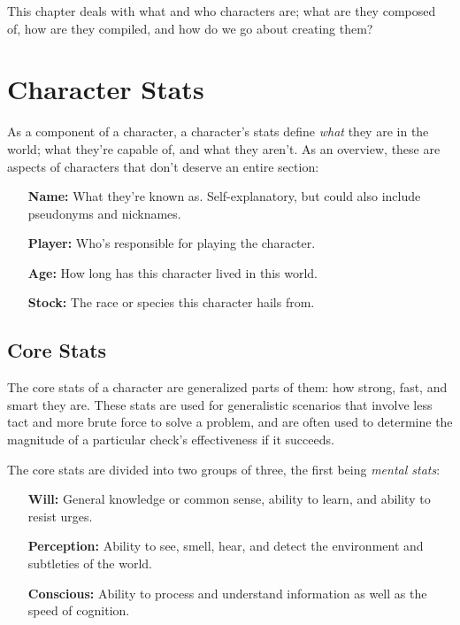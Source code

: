 \documentclass[../main.tex]{subfiles}
\begin{document}
    This chapter deals with what and who characters are; what are they composed of, how are they compiled, and how do we go about creating them? 

    \section{Character Stats}

        As a component of a character, a character's stats define \emph{what} they are in the world; what they're capable of, and what they aren't. As an overview, these are aspects of characters that don't deserve an entire section:

        \begin{itemize}
            \item [\textbf{Name:}] What they're known as. Self-explanatory, but could also include pseudonyms and nicknames.
            \item [\textbf{Player:}] Who's responsible for playing the character.
            \item [\textbf{Age:}] How long has this character lived in this world.
            \item [\textbf{Stock:}] The race or species this character hails from.
        \end{itemize}

    \subsection{Core Stats}

        The core stats of a character are generalized parts of them: how strong, fast, and smart they are. These stats are used for generalistic scenarios that involve less tact and more brute force to solve a problem, and are often used to determine the magnitude of a particular check's effectiveness if it succeeds.

        The core stats are divided into two groups of three, the first being \emph{mental stats}:

    \begin{itemize}
        \item[ \textbf{Will:}] General knowledge or common sense, ability to learn, and ability to resist urges. 
        \item [\textbf{Perception:}] Ability to see, smell, hear, and detect the environment and subtleties of the world.
        \item [\textbf{Conscious:}] Ability to process and understand information as well as the speed of cognition.
    \end{itemize}
\end{document}
